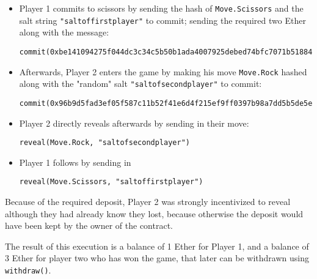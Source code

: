 \begin{itemize}
	\item Player 1 commits to scissors by sending the hash of \texttt{Move.Scissors} and the salt string \texttt{"saltoffirstplayer"} to commit; sending the required two Ether along with the message:
	      \begin{verbatim}
commit(0xbe141094275f044dc3c34c5b50b1ada4007925debed74bfc7071b518840b5203)
\end{verbatim}
	\item Afterwards, Player 2 enters the game by making his move \texttt{Move.Rock} hashed along with the "random" salt \texttt{"saltofsecondplayer"} to commit:
	      \begin{verbatim}
commit(0x96b9d5fad3ef05f587c11b52f41e6d4f215ef9ff0397b98a7dd5b5de5e151843)
\end{verbatim}
	\item Player 2 directly reveals afterwards by sending in their move:
	      \begin{verbatim}
reveal(Move.Rock, "saltofsecondplayer")
\end{verbatim}
	\item Player 1 follows by sending in
	      \begin{verbatim}
reveal(Move.Scissors, "saltoffirstplayer")
\end{verbatim}
\end{itemize}

Because of the required deposit, Player 2 was strongly incentivized to reveal although they had already know they lost, because otherwise the deposit would have been kept by the owner of the contract.

The result of this execution is a balance of 1 Ether for Player 1, and a balance of 3 Ether for player two who has won the game, that later can be withdrawn using \texttt{withdraw()}.

\pagebreak{}
